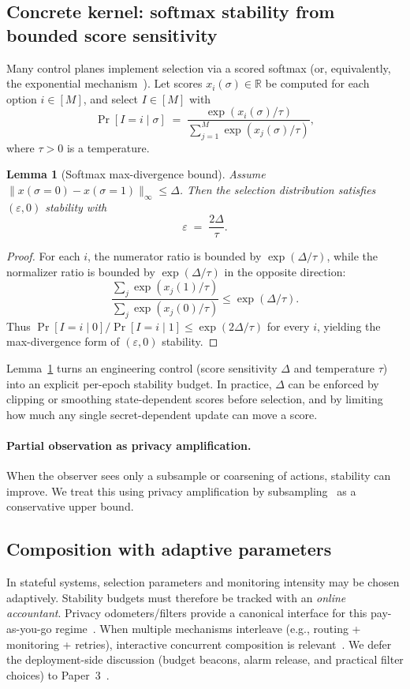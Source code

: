 \documentclass[11pt]{article}
\newtheorem{lemma}{Lemma}
\begin{document}
\subsection{Concrete kernel: softmax stability from bounded score sensitivity}
Many control planes implement selection via a scored softmax (or, equivalently, the exponential mechanism~\cite{mcsherry2007mechanism}).
Let scores $x_i(\sigma)\in\mathbb{R}$ be computed for each option $i\in[M]$, and select $I\in[M]$ with
\[
\Pr[I=i\mid \sigma] \;=\; \frac{\exp(x_i(\sigma)/\tau)}{\sum_{j=1}^M \exp(x_j(\sigma)/\tau)},
\]
where $\tau>0$ is a temperature.

\begin{lemma}[Softmax max-divergence bound]
\label{lem:softmax-stability}
Assume $\|x(\sigma{=}0)-x(\sigma{=}1)\|_\infty \le \Delta$.
Then the selection distribution satisfies $(\varepsilon,0)$ stability with
\[
\varepsilon \;=\; \frac{2\Delta}{\tau}.
\]
\end{lemma}

\begin{proof}
For each $i$, the numerator ratio is bounded by $\exp(\Delta/\tau)$, while the normalizer ratio is bounded by $\exp(\Delta/\tau)$ in the opposite direction:
\[
\frac{\sum_j \exp(x_j(1)/\tau)}{\sum_j \exp(x_j(0)/\tau)} \le \exp(\Delta/\tau).
\]
Thus $\Pr[I=i\mid 0]/\Pr[I=i\mid 1]\le \exp(2\Delta/\tau)$ for every $i$, yielding the max-divergence form of $(\varepsilon,0)$ stability.
\end{proof}

Lemma~\ref{lem:softmax-stability} turns an engineering control (score sensitivity $\Delta$ and temperature $\tau$) into an explicit per-epoch stability budget.
In practice, $\Delta$ can be enforced by clipping or smoothing state-dependent scores before selection, and by limiting how much any single secret-dependent update can move a score.

\paragraph{Partial observation as privacy amplification.}
When the observer sees only a subsample or coarsening of actions, stability can improve.
We treat this using privacy amplification by subsampling~\cite{balle2018subsampling} as a conservative upper bound.

\subsection{Composition with adaptive parameters}
In stateful systems, selection parameters and monitoring intensity may be chosen adaptively.
Stability budgets must therefore be tracked with an \emph{online accountant}.
Privacy odometers/filters provide a canonical interface for this pay-as-you-go regime~\cite{rogers2016odometers,whitehouse2023fullyadaptive}.
When multiple mechanisms interleave (e.g., routing + monitoring + retries), interactive concurrent composition is relevant~\cite{vadhanwang2021concurrentdp,zhang2023concurrentinteractive}.
We defer the deployment-side discussion (budget beacons, alarm release, and practical filter choices) to Paper~3~\cite{series:state3}.
\end{document}
